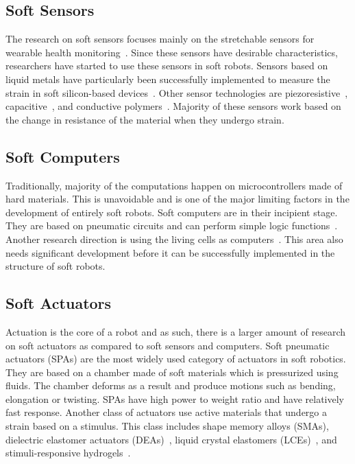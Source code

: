 \subsection{Soft Sensors}
The research on soft sensors focuses mainly on the stretchable sensors for wearable health monitoring~\cite{Liu2017c,Amjadi2016a}. Since these sensors have desirable characteristics, researchers have started to use these sensors in soft robots. Sensors based on liquid metals have particularly been successfully implemented to measure the strain in soft silicon-based devices~\cite{Hammond2014,Chossat2013, Wang2019c,Ren2020}. Other sensor technologies are piezoresistive~\cite{Georgopoulou2020,Turgut2018,Melnykowycz2016}, capacitive~\cite{Hohimer2020,Cao2020,White2017,Frutiger2015}, and conductive polymers~\cite{Chen2021,Kanoun2021,Harito2020}. Majority of these sensors work based on the change in resistance of the material when they undergo strain. 
\subsection{Soft Computers}
Traditionally,  majority of the computations happen on microcontrollers made of hard materials. This is unavoidable and is one of the major limiting factors in the development of entirely soft robots. Soft computers are in their incipient stage. They are based on pneumatic circuits and can perform simple logic functions~\cite{Preston2019,Garrad2019}. Another research direction is using the living cells as computers~\cite{Daniel2013}. This area also needs significant development before it can be successfully implemented in the structure of soft robots. 
\subsection{Soft Actuators}
Actuation is the core of a robot and as such, there is a larger amount of research on soft actuators as compared to soft sensors and computers. Soft pneumatic actuators (SPAs) \cite{Gorissen2017, Branyan2018} are the most widely used category of actuators in soft robotics. They are based on a chamber made of soft materials which is pressurized using fluids. The chamber deforms as a result and produce motions such as bending, elongation or twisting. SPAs have high power to weight ratio and have relatively fast response.  Another class of actuators use active materials that undergo a strain based on a stimulus. This class includes shape memory alloys (SMAs)\cite{Cianchetti2014}, dielectric elastomer actuators (DEAs)~\cite{Carpi2008,Gu2017}, liquid crystal elastomers (LCEs)~\cite{Kularatne2017,Yu2015a}, and stimuli-responsive hydrogels~\cite{Calvert2009,Liu2020,Ionov2014,Banerjee2018}. 
 
